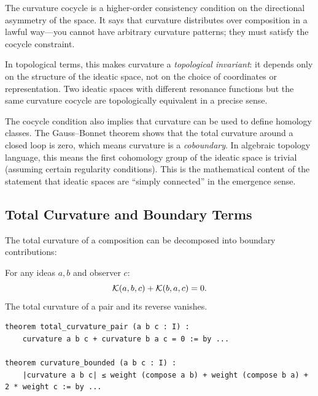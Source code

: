 \begin{interpretation}
The curvature cocycle is a higher-order consistency condition on the directional
asymmetry of the space. It says that curvature distributes over composition in a
lawful way---you cannot have arbitrary curvature patterns; they must satisfy the
cocycle constraint.

In topological terms, this makes curvature a \emph{topological invariant}: it
depends only on the structure of the ideatic space, not on the choice of
coordinates or representation. Two ideatic spaces with different resonance
functions but the same curvature cocycle are topologically equivalent in a
precise sense.

The cocycle condition also implies that curvature can be used to define homology
classes. The Gauss--Bonnet theorem shows that the total curvature around a closed
loop is zero, which means curvature is a \emph{coboundary}. In algebraic topology
language, this means the first cohomology group of the ideatic space is trivial
(assuming certain regularity conditions). This is the mathematical content of
the statement that ideatic spaces are ``simply connected'' in the emergence sense.
\end{interpretation}

\subsection{Total Curvature and Boundary Terms}

The total curvature of a composition can be decomposed into boundary contributions:

\begin{theorem}
\label{thm:total-curvature-pair}
For any ideas $a, b$ and observer $c$:
\[
  \mathcal{K}(a, b, c) + \mathcal{K}(b, a, c) = 0.
\]
The total curvature of a pair and its reverse vanishes.
\end{theorem}

\begin{lstlisting}[caption={Total curvature (IDT\_v3\_Emergence.lean)}]
theorem total_curvature_pair (a b c : I) :
    curvature a b c + curvature b a c = 0 := by ...
    
theorem curvature_bounded (a b c : I) :
    |curvature a b c| ≤ weight (compose a b) + weight (compose b a) + 2 * weight c := by ...
\end{lstlisting}

